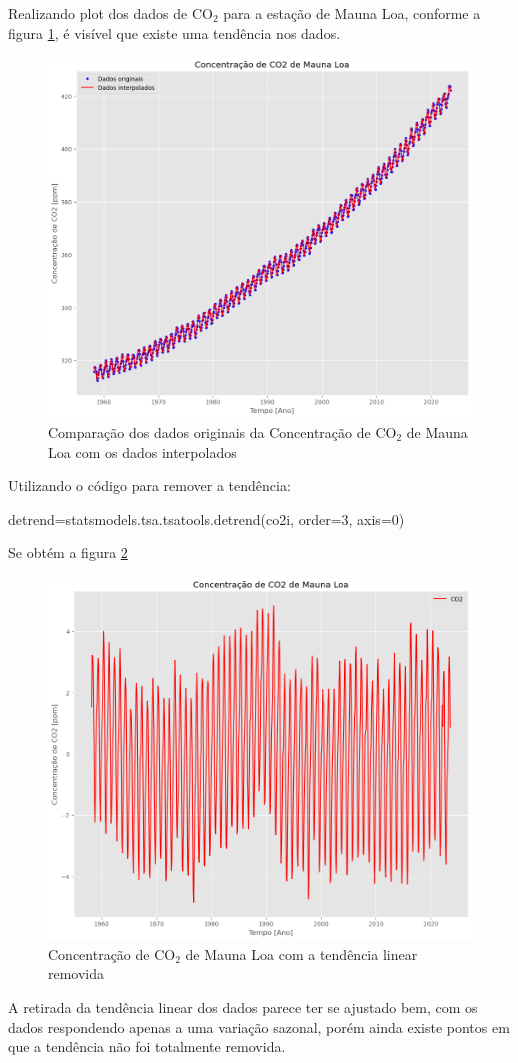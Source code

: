 \documentclass[12pt,a4paper,portuguese]{article}
\begin{document}
Realizando plot dos dados de CO$_2$ para a estação de Mauna Loa, conforme a figura \ref{fig:lista3-4b}, é visível que existe uma tendência nos dados.
\begin{figure}[H]
	\centering
	\includegraphics[width=1\linewidth]{lista3-4b}
	\caption{Comparação dos dados originais da Concentração de  CO$_2$ de Mauna Loa com os dados interpolados}
	\label{fig:lista3-4b}
\end{figure}
Utilizando o código para remover a tendência:
\begin{python}
detrend=statsmodels.tsa.tsatools.detrend(co2i, order=3, axis=0)
\end{python}
Se obtém a figura \ref{fig:lista3-4c}
\begin{figure}[H]
	\centering
	\includegraphics[width=1\linewidth]{lista3-4c}
	\caption{Concentração de  CO$_2$ de Mauna Loa com a tendência linear removida}
	\label{fig:lista3-4c}
\end{figure}
A retirada da tendência linear dos dados parece ter se ajustado bem, com os dados respondendo apenas a uma variação sazonal, porém ainda existe pontos em que a tendência não foi totalmente removida.
\end{document}
